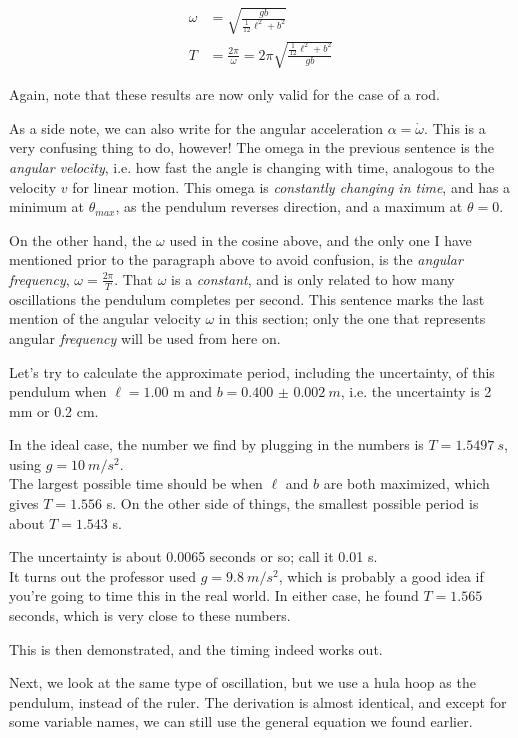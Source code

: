 \documentclass[12pt,a4paper]{report}
\begin{document}
\begin{align}
\omega    &= \sqrt{\frac{g b}{\frac{1}{12} \ell^2 + b^2}}\\
T         &= \frac{2 \pi}{\omega} = 2 \pi \sqrt{\frac{\frac{1}{12} \ell^2 + b^2}{g b}}
\end{align}

Again, note that these results are now only valid for the case of a rod.

As a side note, we can also write for the angular acceleration $\alpha = \dot{\omega}$. This is a very confusing thing to do, however! The omega in the previous sentence is the \emph{angular velocity}, i.e. how fast the angle is changing with time, analogous to the velocity $v$ for linear motion. This omega is \emph{constantly changing in time}, and has a minimum at $\theta_{max}$, as the pendulum reverses direction, and a maximum at $\theta = 0$.

On the other hand, the $\omega$ used in the cosine above, and the only one I have mentioned prior to the paragraph above to avoid confusion, is the \emph{angular frequency}, $\displaystyle \omega = \frac{2 \pi}{T}$. That $\omega$ is a \emph{constant}, and is only related to how many oscillations the pendulum completes per second. This sentence marks the last mention of the angular velocity $\omega$ in this section; only the one that represents angular \emph{frequency} will be used from here on.

Let's try to calculate the approximate period, including the uncertainty, of this pendulum when $\ell = 1.00$ m and $b = \SI{0.400(2)}{m}$, i.e. the uncertainty is 2 mm or 0.2 cm.

In the ideal case, the number we find by plugging in the numbers is $T = \SI{1.5497}{s}$, using $g = \SI{10}{m/s^2}$.\\
The largest possible time should be when $\ell$ and $b$ are both maximized, which gives $T = 1.556$ s. On the other side of things, the smallest possible period is about $T = 1.543$ s.

The uncertainty is about 0.0065 seconds or so; call it 0.01 s.\\
It turns out the professor used $g = \SI{9.8}{m/s^2}$, which is probably a good idea if you're going to time this in the real world. In either case, he found $T = 1.565$ seconds, which is very close to these numbers.

This is then demonstrated, and the timing indeed works out.

Next, we look at the same type of oscillation, but we use a hula hoop as the pendulum, instead of the ruler. The derivation is almost identical, and except for some variable names, we can still use the general equation we found earlier.
\end{document}
